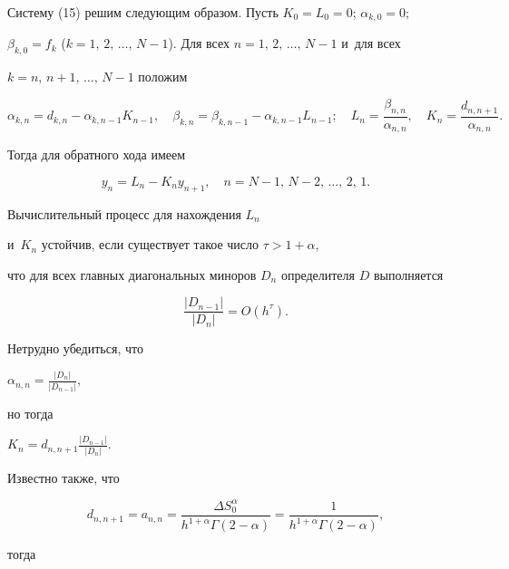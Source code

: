 Систему (15) решим следующим образом. Пусть $K_0=L_0=0$; $\alpha_{k,0}=0$; 

$\beta_{k,0}=f_k$ ($k=1,\,2,\, \dots,\,N{-}1$). Для всех $n=1,\,2,\,\dots,\,N-1$ и~для всех 

$k=n,\,n+1,\, \dots,\,N-1$ положим 

$$ 

\alpha_{k,n}=d_{k,n}-\alpha_{k,n-1}K_{n-1},\quad 

\beta_{k,n}=\beta_{k,n-1}-\alpha_{k,n-1} L_{n-1}; \quad  

L_n=\frac{\beta_{n,n}}{\alpha_{n,n}}, \quad K_n=\frac{d_{n,n+1}}{\alpha_{n,n}}. 

$$ 

Тогда для обратного хода имеем

$$

y_n=L_n -K_n y_{n+1},\quad n=N-1,\,N-2,\, \dots,\,2,\,1.

$$



\begin{theorem}

Вычислительный процесс для нахождения $L_n$ 

и~$K_n$ устойчив, если существует такое число $\tau> 1+\alpha$, 

что для всех главных диагональных миноров $D_n$ определителя $D$ выполняется 

$$ 

\frac{|D_{n-1}|}{|D_n|}=O(h^\tau). 

$$ 

\end{theorem}



Нетрудно убедиться, что 

$ 

\alpha_{n,n}=\frac{|D_n|}{|D_{n-1}|},

$ 

но тогда  

$ 

K_n=d_{n,n+1}\frac{|D_{n-1}|}{|D_{n}|}. 

$ 



Известно также, что 

$$ 

d_{n,n+1}=a_{n,n}=\frac{\Delta S^\alpha_0}{h^{1+\alpha} \Gamma(2-\alpha)}= 

\frac{1}{h^{1+\alpha} \Gamma(2-\alpha)}, 

$$ 

тогда 

